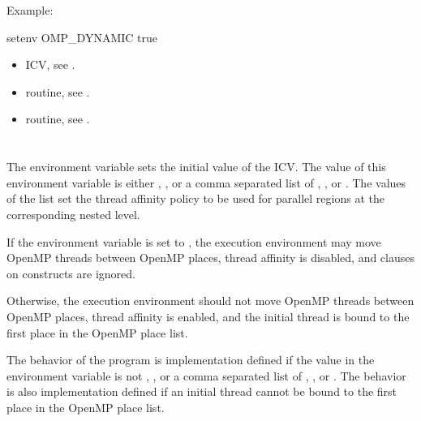 Example:
\begin{boxedcode}
setenv OMP\_DYNAMIC true
\end{boxedcode}

\crossreferences
\begin{itemize}
\item {} ICV, see .

\item {} routine, see .

\item {} routine, see .
\end{itemize}









\section{}
\label{sec:OMP_PROC_BIND}
The  environment variable sets the initial value of the  ICV. 
The value of this environment variable is either , , or a comma separated 
list of , , or . The values of the list set the thread affinity policy 
to be used for parallel regions at the corresponding nested level.

If the environment variable is set to , the execution environment may move 
OpenMP threads between OpenMP places, thread affinity is disabled, and  
clauses on  constructs are ignored.

Otherwise, the execution environment should not move OpenMP threads between 
OpenMP places, thread affinity is enabled, and the initial thread is bound to the first 
place in the OpenMP place list.

The behavior of the program is implementation defined if the value in the 
 environment variable is not , , or a comma separated 
list of , , or . The behavior is also implementation defined if an 
initial thread cannot be bound to the first place in the OpenMP place list.


